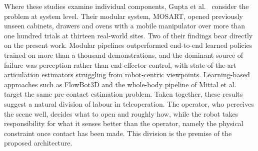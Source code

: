 \documentclass[11pt,letterpaper]{article}
\begin{document}
Where these studies examine individual components, Gupta et al.\ \cite{gupta2025opening} consider the problem at system level. Their modular system, MOSART, opened previously unseen cabinets, drawers and ovens with a mobile manipulator over more than one hundred trials at thirteen real-world sites. Two of their findings bear directly on the present work. Modular pipelines outperformed end-to-end learned policies trained on more than a thousand demonstrations, and the dominant source of failure was perception rather than end-effector control, with state-of-the-art articulation estimators struggling from robot-centric viewpoints. Learning-based approaches such as FlowBot3D \cite{eisner2022flowbot3d} and the whole-body pipeline of Mittal et al.\ \cite{mittal2022articulated} target the same pre-contact estimation problem. Taken together, these results suggest a natural division of labour in teleoperation. The operator, who perceives the scene well, decides what to open and roughly how, while the robot takes responsibility for what it senses better than the operator, namely the physical constraint once contact has been made. This division is the premise of the proposed architecture.
\end{document}
